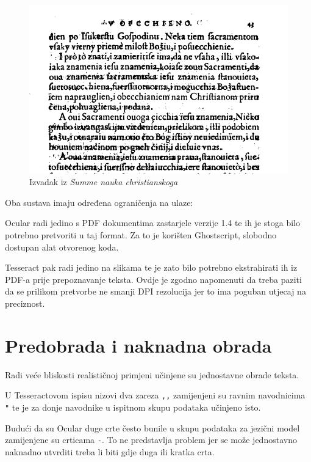\documentclass[zavrsnirad]{fer}
\begin{document}
\begin{figure}[H]
	\centering
	\includegraphics[width=1.0\linewidth]{Figures/summa.png} 
	\caption{Izvadak iz \textit{Summe nauka christianskoga}}
	\label{slk:summa}
\end{figure}

Oba sustava imaju određena ograničenja na ulaze: 

Ocular radi jedino s PDF dokumentima zastarjele verzije 1.4 te ih je stoga bilo potrebno pretvoriti u taj format. Za to je korišten Ghostscript, \cite{Ghostscript} slobodno dostupan alat otvorenog koda. 

Tesseract pak radi jedino na slikama te je zato bilo potrebno ekstrahirati ih iz PDF-a prije prepoznavanje teksta. Ovdje je zgodno napomenuti da treba paziti da se prilikom pretvorbe ne smanji DPI rezolucija jer to ima poguban utjecaj na preciznost.

\section{Predobrada i naknadna obrada}

Radi veće bliskosti realističnoj primjeni učinjene su jednostavne obrade teksta.

U Tesseractovom ispisu nizovi dva zareza \texttt{,,} zamijenjeni su ravnim navodnicima \texttt{"} te je za donje navodnike u ispitnom skupu podataka učinjeno isto.

Budući da su Ocular duge crte često bunile u skupu podataka za jezični model zamijenjene su crticama \texttt{-}. To ne predstavlja problem jer se može jednostavno naknadno utvrditi treba li biti gdje duga ili kratka crta.
\end{document}
